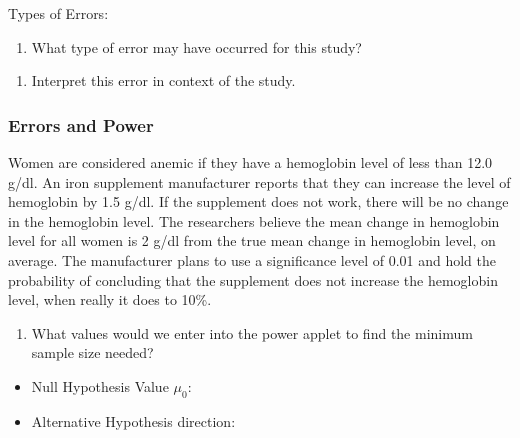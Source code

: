 \documentclass[
]{report}
\providecommand{\tightlist}{%
  \setlength{\itemsep}{0pt}\setlength{\parskip}{0pt}}
\begin{document}
Types of Errors:

\begin{enumerate}
\def\labelenumi{\arabic{enumi}.}
\setcounter{enumi}{8}
\tightlist
\item
  What type of error may have occurred for this study?
\end{enumerate}

\vspace{0.3in}

\begin{enumerate}
\def\labelenumi{\arabic{enumi}.}
\setcounter{enumi}{9}
\tightlist
\item
  Interpret this error in context of the study.
\end{enumerate}

\vspace{0.5in}

\subsubsection*{Errors and Power}\label{errors-and-power}

Women are considered anemic if they have a hemoglobin level of less than 12.0 g/dl. An iron supplement manufacturer reports that they can increase the level of hemoglobin by 1.5 g/dl. If the supplement does not work, there will be no change in the hemoglobin level. The researchers believe the mean change in hemoglobin level for all women is 2 g/dl from the true mean change in hemoglobin level, on average. The manufacturer plans to use a significance level of 0.01 and hold the probability of concluding that the supplement does not increase the hemoglobin level, when really it does to 10\%.

\begin{enumerate}
\def\labelenumi{\alph{enumi}.}
\tightlist
\item
  What values would we enter into the power applet to find the minimum sample size needed?
\end{enumerate}

\begin{itemize}
\tightlist
\item
  Null Hypothesis Value \(\mu_0\):
\end{itemize}

\vspace{0.1in}

\begin{itemize}
\tightlist
\item
  Alternative Hypothesis direction:
\end{itemize}
\end{document}
